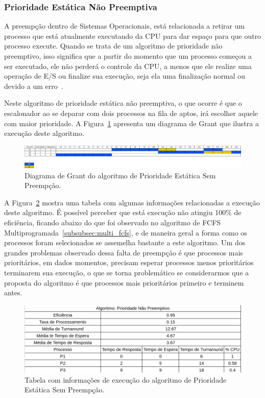 \documentclass[
	12pt,				%
	oneside,   	        %
	a4paper,			%
	english,			%
	french,				%
	spanish,			%
	brazil,				%
	]{pacotes/abntex2}
\begin{document}
\subsubsection{Prioridade Estática Não Preemptiva}
\label{subsubsec:prio_sem_preemp}

A preempção dentro de Sistemas Operacionais, está relacionada a retirar um processo que está atualmente executando da CPU para dar espaço para que outro processo execute. Quando se trata de um algoritmo de prioridade não preemptivo, isso significa que a partir do momento que um processo começou a ser executado, ele não perderá o controle da CPU, a menos que ele realize uma operação de E/S ou finalize sua execução, seja ela uma finalização normal ou devido a um erro~\cite{maziero2019}.

Neste algoritmo de prioridade estática não preemptiva, o que ocorre é que o escalonador ao se deparar com dois processos na fila de aptos, irá escolher aquele com maior prioridade. A Figura~\ref{fig:prio_sem_preemp} apresenta um diagrama de Grant que ilustra a execução deste algoritmo.

\begin{figure}[H]
  \centering
  \includegraphics[scale=0.20]{figuras/ex2/prio_sem_preemp.png}
  \caption{Diagrama de Grant do algoritmo de Prioridade Estática Sem Preempção.}
  \label{fig:prio_sem_preemp}
\end{figure}

A Figura~\ref{fig:table_prio_sem_preemp} mostra uma tabela com algumas informações relacionadas a execução deste algoritmo. É possível perceber que está execução não atingiu 100\% de eficiência, ficando abaixo do que foi observado no algoritmo de FCFS Multiprogramada~\ref{subsubsec:multi_fcfs}, e de maneira geral a forma como os processos foram selecionados se assemelha bastante a este algoritmo. Um dos grandes problemas observado dessa falta de preempção é que processos mais prioritários, em dados momentos, precisam esperar processos menos prioritários terminarem sua execução, o que se torna problemático se considerarmos que a proposta do algoritmo é que processos mais prioritários primeiro e terminem antes.

\begin{figure}[H]
  \centering
  \includegraphics[scale=0.5]{figuras/ex2/table_prio_sem_preemp.png}
  \caption{Tabela com informações de execução do algoritmo de Prioridade Estática Sem Preempção.}
  \label{fig:table_prio_sem_preemp}
\end{figure}
\end{document}
